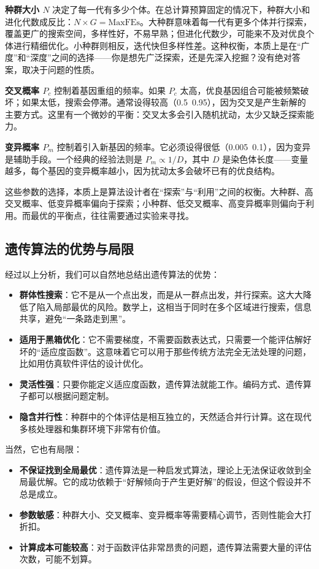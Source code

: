 \documentclass[lang=cn,zihao=-4,a4paper,fontset=windows]{beautybook}
\begin{document}
\textbf{种群大小 $N$} 决定了每一代有多少个体。在总计算预算固定的情况下，种群大小和进化代数成反比：$N \times G = \text{MaxFEs}$。大种群意味着每一代有更多个体并行探索，覆盖更广的搜索空间，多样性好，不易早熟；但进化代数少，可能来不及对优良个体进行精细优化。小种群则相反，迭代快但多样性差。这种权衡，本质上是在“广度”和“深度”之间的选择——你是想先广泛探索，还是先深入挖掘？没有绝对答案，取决于问题的性质。

\textbf{交叉概率 $P_c$} 控制着基因重组的频率。如果 $P_c$ 太高，优良基因组合可能被频繁破坏；如果太低，搜索会停滞。通常设得较高（0.5~0.95），因为交叉是产生新解的主要方式。这里有一个微妙的平衡：交叉太多会引入随机扰动，太少又缺乏探索能力。

\textbf{变异概率 $P_m$} 控制着引入新基因的频率。它必须设得很低（0.005~0.1），因为变异是辅助手段。一个经典的经验法则是 $P_m \propto 1/D$，其中 $D$ 是染色体长度——变量越多，每个基因的变异概率越小，因为扰动太多会破坏已有的优良结构。

这些参数的选择，本质上是算法设计者在“探索”与“利用”之间的权衡。大种群、高交叉概率、低变异概率偏向于探索；小种群、低交叉概率、高变异概率则偏向于利用。而最优的平衡点，往往需要通过实验来寻找。

\subsection{遗传算法的优势与局限}

经过以上分析，我们可以自然地总结出遗传算法的优势：

\begin{itemize}
    \item \textbf{群体性搜索}：它不是从一个点出发，而是从一群点出发，并行探索。这大大降低了陷入局部最优的风险。数学上，这相当于同时在多个区域进行搜索，信息共享，避免“一条路走到黑”。
    \item \textbf{适用于黑箱优化}：它不需要梯度，不需要函数表达式，只需要一个能评估解好坏的“适应度函数”。这意味着它可以用于那些传统方法完全无法处理的问题，比如用仿真软件评估的设计优化。
    \item \textbf{灵活性强}：只要你能定义适应度函数，遗传算法就能工作。编码方式、遗传算子都可以根据问题定制。
    \item \textbf{隐含并行性}：种群中的个体评估是相互独立的，天然适合并行计算。这在现代多核处理器和集群环境下非常有价值。
\end{itemize}

当然，它也有局限：

\begin{itemize}
    \item \textbf{不保证找到全局最优}：遗传算法是一种启发式算法，理论上无法保证收敛到全局最优解。它的成功依赖于“好解倾向于产生更好解”的假设，但这个假设并不总是成立。
    \item \textbf{参数敏感}：种群大小、交叉概率、变异概率等需要精心调节，否则性能会大打折扣。
    \item \textbf{计算成本可能较高}：对于函数评估非常昂贵的问题，遗传算法需要大量的评估次数，可能不划算。
\end{itemize}
\end{document}
